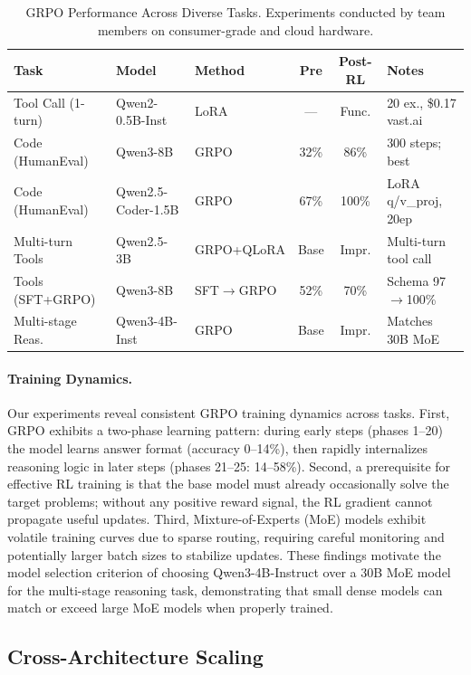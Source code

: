 \documentclass{article}
\begin{document}
\begin{table}[t]
\centering
\caption{GRPO Performance Across Diverse Tasks. Experiments conducted by team members
on consumer-grade and cloud hardware.}
\label{tab:task_grpo}
\footnotesize
\begin{tabular}{@{}l l l c c p{2.8cm}@{}}
\toprule
\textbf{Task} & \textbf{Model} & \textbf{Method} & \textbf{Pre} & \textbf{Post-RL} & \textbf{Notes} \\
\midrule
Tool Call (1-turn) & Qwen2-0.5B-Inst & LoRA & --- & Func. & 20 ex., \$0.17 vast.ai \\
Code (HumanEval) & Qwen3-8B & GRPO & 32\% & 86\% & 300 steps; best \\
Code (HumanEval) & Qwen2.5-Coder-1.5B & GRPO & 67\% & 100\% & LoRA q/v\_proj, 20ep \\
Multi-turn Tools & Qwen2.5-3B & GRPO+QLoRA & Base & Impr. & Multi-turn tool call \\
Tools (SFT+GRPO) & Qwen3-8B & SFT$\to$GRPO & 52\% & 70\% & Schema 97$\to$100\% \\
Multi-stage Reas. & Qwen3-4B-Inst & GRPO & Base & Impr. & Matches 30B MoE \\
\bottomrule
\end{tabular}
\end{table}

\paragraph{Training Dynamics.}
Our experiments reveal consistent GRPO training dynamics across tasks.
First, GRPO exhibits a two-phase learning pattern: during early steps (phases
1--20) the model learns answer format (accuracy 0--14\%), then rapidly
internalizes reasoning logic in later steps (phases 21--25: 14--58\%).
Second, a prerequisite for effective RL training is that the base model must
already occasionally solve the target problems; without any positive reward
signal, the RL gradient cannot propagate useful updates. Third, Mixture-of-Experts
(MoE) models exhibit volatile training curves due to sparse routing, requiring
careful monitoring and potentially larger batch sizes to stabilize updates.
These findings motivate the model selection criterion of choosing Qwen3-4B-Instruct
over a 30B MoE model for the multi-stage reasoning task, demonstrating that
small dense models can match or exceed large MoE models when properly trained.

\subsection{Cross-Architecture Scaling}
\label{sec:cross_arch_scaling}
\end{document}
